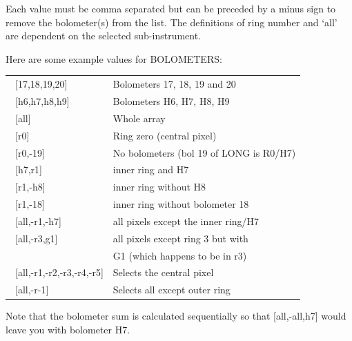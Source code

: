 \documentclass[twoside,11pt]{starlink}
\begin{document}
{{{   Each value must be comma separated but can be preceded by a minus sign to
remove the bolometer(s) from the list. The definitions of ring number and
`all' are dependent on the selected sub-instrument.

  Here are some example values for BOLOMETERS:

 \begin{tabular}{ll}

 \ [17,18,19,20]  &                  Bolometers 17, 18, 19 and 20\\
 \ [h6,h7,h8,h9]  &                  Bolometers H6, H7, H8, H9 \\
 \ [all]          &                  Whole array \\
 \ [r0]           &                  Ring zero (central pixel)\\
 \ [r0,-19]       &                  No bolometers (bol 19 of LONG is R0/H7)\\
 \ [h7,r1]        &                  inner ring and H7\\
 \ [r1,-h8]       &                  inner ring without H8\\
 \ [r1,-18]       &                  inner ring without bolometer 18\\
 \ [all,-r1,-h7]  &                  all pixels except the inner ring/H7\\
 \ [all,-r3,g1]   &                  all pixels except ring 3 but with\\
   &                                      G1 (which happens to be in r3)\\
 \ [all,-r1,-r2,-r3,-r4,-r5]  &      Selects the central pixel \\
 \ [all,-r-1]     &                  Selects all except outer ring\\

 \end{tabular}

Note that the bolometer sum is calculated sequentially so that [all,-all,h7]
would leave you with bolometer H7.

      }
      }}
\end{document}
